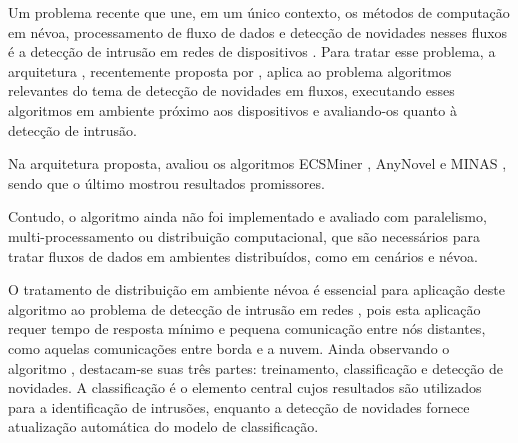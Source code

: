 Um problema recente que une, em um único contexto, os métodos de computação em
névoa, processamento de fluxo de dados e detecção de novidades nesses fluxos é a
detecção de intrusão em redes de dispositivos \iot.
Para tratar esse problema, a arquitetura \arch, recentemente proposta por
, aplica ao problema algoritmos relevantes
do tema de detecção de
novidades em fluxos, executando esses algoritmos em ambiente próximo aos
dispositivos e avaliando-os quanto à detecção de intrusão.

Na arquitetura proposta,  avaliou os algoritmos
ECSMiner \cite{Masud2010ECSMiner}, AnyNovel \cite{Abdallah2016anynovel} e MINAS
\cite{Faria2016minas}, sendo que o último mostrou resultados promissores.

Contudo, o algoritmo \minas ainda não foi implementado e avaliado com paralelismo,
multi-processamento ou distribuição computacional, que são necessários para
tratar fluxos de dados 
em ambientes distribuídos, como em cenários \iot e névoa.

O tratamento de distribuição em ambiente névoa é essencial para aplicação deste
algoritmo ao problema de detecção de intrusão em redes \iot, pois esta aplicação
requer tempo de resposta mínimo e pequena comunicação entre nós distantes, como
aquelas comunicações entre borda e a nuvem.
Ainda observando o algoritmo \minas, destacam-se suas três partes: treinamento,
classificação e detecção de novidades.
A classificação é o elemento central cujos resultados são utilizados
para a identificação de intrusões, enquanto a detecção de novidades fornece
atualização automática do modelo de classificação.

